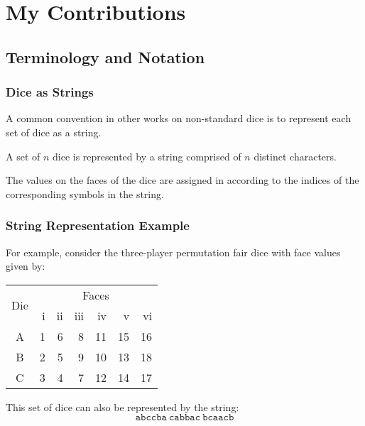 \documentclass[aspectratio=169]{beamer}
\begin{document}
\section{My Contributions}
\begin{frame}[Triangle=siiorange]
	\tocpage
\end{frame}


\subsection{Terminology and Notation}
\begin{frame}[triangle=siiblue]
\frametitle{Dice as Strings}
A common convention in other works on non-standard dice is to represent each set of dice as a string.

\vfill

A set of $n$ dice is represented by a string comprised of $n$ distinct characters.  

\vfill

The values on the faces of the dice are assigned in according to the indices of the corresponding symbols in the string.
\end{frame}

\begin{frame}[triangle=siiblue]
\frametitle{String Representation Example}
For example, consider the three-player permutation fair dice with face values given by:
\begin{table}
\begin{tabular}{c rrrrrr} \toprule
\multirow{2}[2]{*}{Die} &  \multicolumn{6}{c}{Faces} \\ \cmidrule(lr){2-7}     
   & i & ii & iii & iv & v & vi \\ \midrule
A & 1 & 6 & 8 & 11 & 15 & 16 \\
B & 2 & 5 &  9 & 10 & 13 & 18 \\
C & 3 & 4 & 7 & 12 & 14 & 17 \\ \bottomrule
\end{tabular}
\end{table}

\vfill

This set of dice can also be represented by the string:
\begin{equation*}
		\texttt{abccba} \ \texttt{cabbac} \ \texttt{bcaacb}
\end{equation*}
\end{frame}
\end{document}
